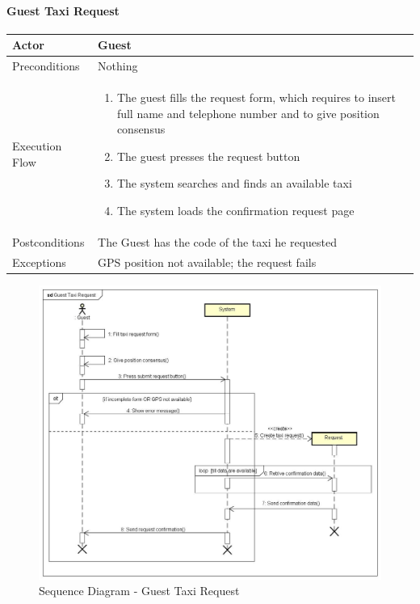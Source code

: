 		\paragraph{Guest Taxi Request}
			\begin{center}
				\begin{tabular}{ | l | p{8cm} |}
					\hline
					Actor &  Guest	\\ \hline
					Preconditions & Nothing		\\ \hline
					Execution Flow & \begin{enumerate}
						\item The guest fills the request form, which requires to insert full name and telephone number and to give position consensus
						\item The guest presses the request button
						\item The system searches and finds an available taxi
						\item The system loads the confirmation request page
					\end{enumerate}		\\ \hline
					Postconditions & The Guest has the code of the taxi he requested	\\ \hline
					Exceptions & GPS position not available; the request fails \\ \hline
				\end{tabular}
			\end{center}
			\begin{figure}[!h]
				\begin{center}			
					\includegraphics[scale=0.4]{../SE2_SD/GuestTaxiRequest}
					\caption{Sequence Diagram - Guest Taxi Request}	
				\end{center}
			\end{figure}
